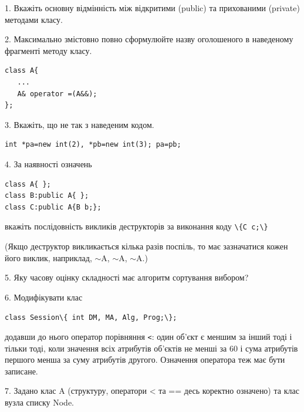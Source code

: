 \documentclass[12pt, ukrainian]{article}
\def\code#1{\Verb!#1!}
\begin{document}
{%
1. Вкажіть основну відмінність між відкритими (public) та прихованими (private) методами класу.%
\par
\vspace{2mm}
2. Максимально змістовно повно сформулюйте назву оголошеного в наведеному фрагменті методу класу.
\vspace{-3mm}
\begin{verbatim}class A{
   ...
   A& operator =(A&&);
};\end{verbatim}
\vspace{-3mm}
\par
\vspace{2mm}
3. Вкажіть, що не так з наведеним кодом.
\vspace{-3mm}
\begin{verbatim}int *pa=new int(2), *pb=new int(3); pa=pb;\end{verbatim}
\vspace{-3mm}
\par
\vspace{2mm}
4. За наявності означень
\vspace{-3mm}
\begin{verbatim}
class A{ };
class B:public A{ };
class C:public A{B b;};\end{verbatim}
\vspace{-3mm}
вкажіть послідовність викликів деструкторів за виконання коду \code{\{C c;\}} 

(Якщо деструктор викликається кілька разів поспіль, то має зазначатися кожен його виклик, наприклад, $\sim$A, $\sim$A, $\sim$A.)

\vspace{2mm}
5. Яку часову оцінку складності має алгоритм сортування вибором?
\par
\vspace{2mm}
6. Модифікувати клас 

\qquad\code{class Session\{ int DM, MA, Alg, Prog;\};} 


додавши до нього оператор порівняння \code{<}: один об'єкт є меншим за інший тоді і тільки тоді, коли значення всіх атрибутів об'єктів не менші за 60 і сума атрибутів першого менша за суму атрибутів другого. Означення оператора теж має бути записане.%
\par
\vspace{2mm}
7. 
Задано клас A (структуру, оператори < та == десь коректно означено) та клас вузла списку Node.

}
\end{document}
